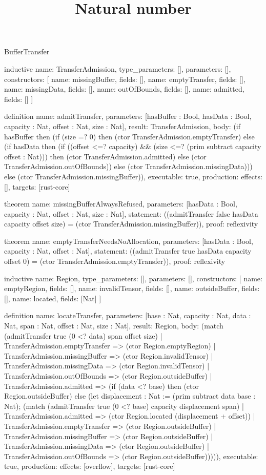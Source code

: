 \begin{lexlean}{BufferTransfer}
\title{Natural number}
\begin{semanticmodule}
inductive{
  name: TransferAdmission,
  type_parameters: [],
  parameters: [],
  constructors: [
    {name: missingBuffer, fields: []},
    {name: emptyTransfer, fields: []},
    {name: missingData, fields: []},
    {name: outOfBounds, fields: []},
    {name: admitted, fields: []}
  ]
}

definition{
  name: admitTransfer,
  parameters: [hasBuffer : Bool, hasData : Bool, capacity : Nat, offset : Nat, size : Nat],
  result: TransferAdmission,
  body: (if hasBuffer then (if (size =? 0) then (ctor TransferAdmission.emptyTransfer) else (if hasData then (if ((offset <=? capacity) && (size <=? (prim subtract capacity offset : Nat))) then (ctor TransferAdmission.admitted) else (ctor TransferAdmission.outOfBounds)) else (ctor TransferAdmission.missingData))) else (ctor TransferAdmission.missingBuffer)),
  executable: true,
  production: {effects: [], targets: [rust-core]}
}

theorem{
  name: missingBufferAlwaysRefused,
  parameters: [hasData : Bool, capacity : Nat, offset : Nat, size : Nat],
  statement: ((admitTransfer false hasData capacity offset size) = (ctor TransferAdmission.missingBuffer)),
  proof: reflexivity{}
}

theorem{
  name: emptyTransferNeedsNoAllocation,
  parameters: [hasData : Bool, capacity : Nat, offset : Nat],
  statement: ((admitTransfer true hasData capacity offset 0) = (ctor TransferAdmission.emptyTransfer)),
  proof: reflexivity{}
}

inductive{
  name: Region,
  type_parameters: [],
  parameters: [],
  constructors: [
    {name: emptyRegion, fields: []},
    {name: invalidTensor, fields: []},
    {name: outsideBuffer, fields: []},
    {name: located, fields: [Nat]}
  ]
}

definition{
  name: locateTransfer,
  parameters: [base : Nat, capacity : Nat, data : Nat, span : Nat, offset : Nat, size : Nat],
  result: Region,
  body: (match (admitTransfer true (0 <? data) span offset size)
    | TransferAdmission.emptyTransfer => (ctor Region.emptyRegion)
    | TransferAdmission.missingBuffer => (ctor Region.invalidTensor)
    | TransferAdmission.missingData => (ctor Region.invalidTensor)
    | TransferAdmission.outOfBounds => (ctor Region.outsideBuffer)
    | TransferAdmission.admitted => (if (data <? base) then (ctor Region.outsideBuffer) else (let displacement : Nat := (prim subtract data base : Nat); (match (admitTransfer true (0 <? base) capacity displacement span)
      | TransferAdmission.admitted => (ctor Region.located (displacement + offset))
      | TransferAdmission.emptyTransfer => (ctor Region.outsideBuffer)
      | TransferAdmission.missingBuffer => (ctor Region.outsideBuffer)
      | TransferAdmission.missingData => (ctor Region.outsideBuffer)
      | TransferAdmission.outOfBounds => (ctor Region.outsideBuffer))))),
  executable: true,
  production: {effects: [overflow], targets: [rust-core]}
}


\end{semanticmodule}
\end{lexlean}
